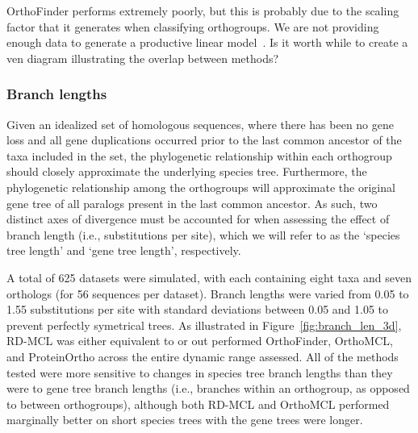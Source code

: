 \documentclass[twocolumn]{bmcart}  %
\begin{document}
OrthoFinder performs extremely poorly, but this is probably due to the scaling factor that it generates when classifying orthogroups.
We are not providing enough data to generate a productive linear model~\cite{Emms:2015ig}.
Is it worth while to create a ven diagram illustrating the overlap between methods?


\subsubsection{Branch lengths}
Given an idealized set of homologous sequences, where there has been no gene loss and all gene duplications occurred prior to the last common ancestor of the taxa included in the set, the phylogenetic relationship within each orthogroup should closely approximate the underlying species tree.
Furthermore, the phylogenetic relationship among the orthogroups will approximate the original gene tree of all paralogs present in the last common ancestor.
As such, two distinct axes of divergence must be accounted for when assessing the effect of branch length (i.e., substitutions per site), which we will refer to as the `species tree length' and `gene tree length', respectively.


A total of 625 datasets were simulated, with each containing eight taxa and seven orthologs (for 56 sequences per dataset).
Branch lengths were varied from 0.05 to 1.55 substitutions per site with standard deviations between 0.05 and 1.05 to prevent perfectly symetrical trees.
As illustrated in Figure~\ref{fig:branch_len_3d}, RD-MCL was either equivalent to or out performed OrthoFinder, OrthoMCL, and ProteinOrtho across the entire dynamic range assessed.
All of the methods tested were more sensitive to changes in species tree branch lengths than they were to gene tree branch lengths (i.e., branches within an orthogroup, as opposed to between orthogroups), although both RD-MCL and OrthoMCL performed marginally better on short species trees with the gene trees were longer.
\end{document}
